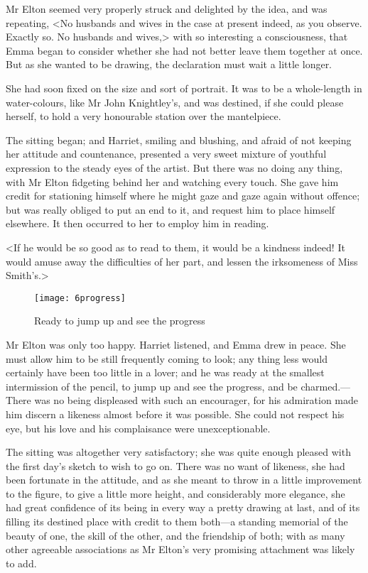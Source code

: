 Mr Elton seemed very properly struck and delighted by the idea, and was repeating, <No husbands and wives in the case at present indeed, as you observe. Exactly so. No husbands and wives,> with so interesting a consciousness, that Emma began to consider whether she had not better leave them together at once. But as she wanted to be drawing, the declaration must wait a little longer.

She had soon fixed on the size and sort of portrait. It was to be a whole-length in water-colours, like Mr John Knightley's, and was destined, if she could please herself, to hold a very honourable station over the mantelpiece.

The sitting began; and Harriet, smiling and blushing, and afraid of not keeping her attitude and countenance, presented a very sweet mixture of youthful expression to the steady eyes of the artist. But there was no doing any thing, with Mr Elton fidgeting behind her and watching every touch. She gave him credit for stationing himself where he might gaze and gaze again without offence; but was really obliged to put an end to it, and request him to place himself elsewhere. It then occurred to her to employ him in reading.

<If he would be so good as to read to them, it would be a kindness indeed! It would amuse away the difficulties of her part, and lessen the irksomeness of Miss Smith's.>


\begin{figure}[tbph]
\centering
\texttt{[image: 6progress]}
\caption{Ready to jump up and see the progress}
\end{figure}

Mr Elton was only too happy. Harriet listened, and Emma drew in peace. She must allow him to be still frequently coming to look; any thing less would certainly have been too little in a lover; and he was ready at the smallest intermission of the pencil, to jump up and see the progress, and be charmed.—There was no being displeased with such an encourager, for his admiration made him discern a likeness almost before it was possible. She could not respect his eye, but his love and his complaisance were unexceptionable.

The sitting was altogether very satisfactory; she was quite enough pleased with the first day's sketch to wish to go on. There was no want of likeness, she had been fortunate in the attitude, and as she meant to throw in a little improvement to the figure, to give a little more height, and considerably more elegance, she had great confidence of its being in every way a pretty drawing at last, and of its filling its destined place with credit to them both—a standing memorial of the beauty of one, the skill of the other, and the friendship of both; with as many other agreeable associations as Mr Elton's very promising attachment was likely to add.

